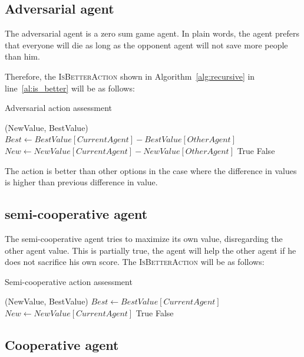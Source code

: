 \documentclass{article}                     %
\begin{document}
	\subsection{Adversarial agent}
	The adversarial agent is a zero sum game agent. In plain words, the agent prefers that everyone will die as long as the opponent agent will not save more people than him.
	
	Therefore, the \textsc{IsBetterAction} shown in Algorithm~\ref{alg:recursive} in line~\ref{al:is_better} will be as follows:
	\begin{algorithm}[H]
		\label{al:adv}
		\caption{Adversarial action assessment}
		\begin{algorithmic}[1]
			(NewValue, BestValue)
			\State $ Best \leftarrow BestValue[CurrentAgent] - BestValue[OtherAgent]$
			\State $ New \leftarrow NewValue[CurrentAgent] - NewValue[OtherAgent]  $
			\State  \Return True
			\Else   \Return False
			\EndIf
			\EndProcedure
		\end{algorithmic}
	\end{algorithm}
	
	The action is better than other options in the case where the difference in values is higher than previous difference in value. 
	
	
	\subsection{semi-cooperative agent}
	The semi-cooperative agent tries to maximize its own value, disregarding the other agent value. This is partially true, the agent will help the other agent if he does not sacrifice his own score.
	The \textsc{IsBetterAction} will be as follows:
	
	\begin{algorithm}[H]
		\label{al:coop}
		\caption{Semi-cooperative action assessment}
		\begin{algorithmic}[1]
			(NewValue, BestValue)
			\State $ Best \leftarrow BestValue[CurrentAgent]$
			\State $ New \leftarrow NewValue[CurrentAgent]$
			\State  \Return True
			\Else   \Return False
			\EndIf
			\EndProcedure
		\end{algorithmic}
	\end{algorithm}
	
	
	\subsection{Cooperative agent}
	
\end{document}

